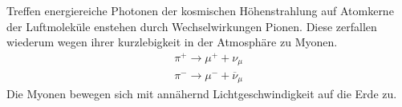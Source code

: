 Treffen energiereiche Photonen der kosmischen Höhenstrahlung auf Atomkerne der Luftmoleküle enstehen durch Wechselwirkungen
Pionen.
Diese zerfallen wiederum wegen ihrer kurzlebigkeit in der Atmosphäre zu Myonen.
\begin{align*}
  \pi^+ \rightarrow \mu^++\nu_\mu\\
  \pi^- \rightarrow \mu^-+\overline{\nu}_\mu
\end{align*}
Die Myonen bewegen sich mit annähernd Lichtgeschwindigkeit auf die Erde zu.
